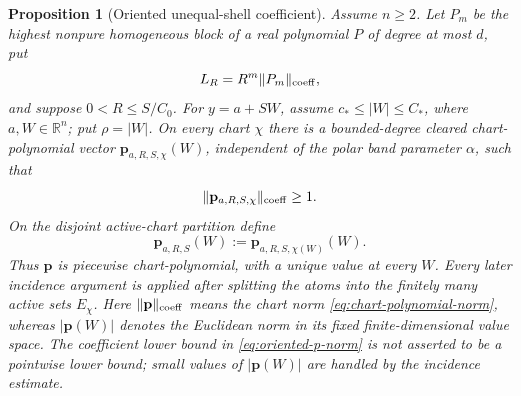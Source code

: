 \documentclass[11pt]{article}
\numberwithin{equation}{section}
\newtheorem{proposition}[theorem]{Proposition}
\theoremstyle{remark}
\theoremstyle{definition}
\newcommand{\R}{\mathbb R}
\newcommand{\norm}[1]{\lVert #1\rVert}
\begin{document}
\begin{proposition}[Oriented unequal-shell coefficient]
\label{prop:oriented-coefficient}
Assume \(n\ge2\).  Let \(P_m\) be the highest nonpure homogeneous block
of a real polynomial \(P\) of degree at most $d$, put
\[
 L_R=R^m\norm{P_m}_{\rm coeff},
\]
and suppose \(0<R\le S/C_0\).  For \(y=a+SW\), assume
\(c_*\le|W|\le C_*\), where $a,W\in\R^n$; put $\rho=|W|$.
On every chart \(\chi\) there is a bounded-degree cleared
chart-polynomial vector
\(\mathbf p_{a,R,S,\chi}(W)\), independent of the polar band parameter
\(\alpha\), such that
\begin{equation}\label{eq:oriented-p-norm}
 \norm{\mathbf p_{a,R,S,\chi}}_{\rm coeff}\ge1.
\end{equation}
On the disjoint active-chart partition define
\begin{equation}\label{eq:active-oriented-p}
 \mathbf p_{a,R,S}(W)
 :=\mathbf p_{a,R,S,\chi(W)}(W).
\end{equation}
Thus \(\mathbf p\) is piecewise chart-polynomial, with a unique value at
every \(W\).  Every later incidence argument is applied after splitting
the atoms into the finitely many active sets \(E_\chi\).
Here $\norm{\mathbf p}_{\rm coeff}$ means the chart norm
\eqref{eq:chart-polynomial-norm}, whereas
$|\mathbf p(W)|$ denotes the Euclidean norm in its fixed finite-dimensional
value space.  The coefficient lower bound in
\eqref{eq:oriented-p-norm} is not asserted to be a pointwise lower bound;
small values of $|\mathbf p(W)|$ are handled by the incidence estimate.


\end{proposition}
\end{document}
